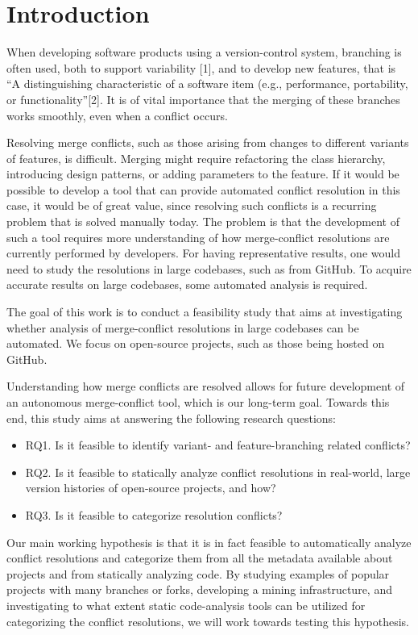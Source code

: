 \chapter{Introduction}
\setlength{\parindent}{0pt}
When developing software products using a version-control system, branching is often used, both to support variability [1], and to develop new features, that is “A distinguishing characteristic of a software item (e.g., performance, portability, or functionality”[2]. It is of vital importance that the merging of these branches works smoothly, even when a conflict occurs.

Resolving merge conflicts, such as those arising from changes to different variants of features, is difficult. Merging might require refactoring the class hierarchy, introducing design patterns, or adding parameters to the feature. If it would be possible to develop a tool that can provide automated conflict resolution in this case, it would be of great value, since resolving such conflicts is a recurring problem that is solved manually today. The problem is that the development of such a tool requires more understanding of how merge-conflict resolutions are currently performed by developers. For having representative results, one would need to study the resolutions in large codebases, such as from GitHub. To acquire accurate results on large codebases, some automated analysis is required.

The goal of this work is to conduct a feasibility study that aims at investigating whether analysis of merge-conflict resolutions in large codebases can be automated. We focus on open-source projects, such as those being hosted on GitHub.

Understanding how merge conflicts are resolved allows for future development of an autonomous merge-conflict tool, which is our long-term goal. Towards this end, this study aims at answering the following research questions:
\begin{itemize}
\item RQ1. Is it feasible to identify variant- and feature-branching related conflicts?
\item RQ2. Is it feasible to statically analyze conflict resolutions in real-world, large version histories of open-source projects, and how?
\item RQ3. Is it feasible to categorize resolution conflicts?
\end{itemize}

Our main working hypothesis is that it is in fact feasible to automatically analyze conflict resolutions and categorize them from all the metadata available about projects and from statically analyzing code. By studying examples of popular projects with many branches or forks, developing a mining infrastructure, and investigating to what extent static code-analysis tools can be utilized for categorizing the conflict resolutions, we will work towards testing this hypothesis.

